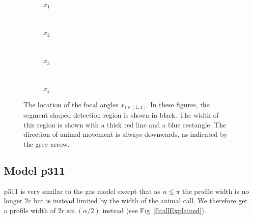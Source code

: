 \begin{figure}[t]
        \centering
        \begin{subfigure}[t]{0.34\textwidth}
                \centering
                \caption{$x_1$}
                \label{f:tikz1}
        \end{subfigure}
        ~ 
        \begin{subfigure}[t]{0.22\textwidth}
                \centering
                \caption{$x_2$}
                \label{f:x2}
        \end{subfigure}
        ~ 
	\begin{subfigure}[t]{0.22\textwidth}
                \centering
                \caption{$x_3$}
                \label{f:x3}
        \end{subfigure}%
	~
	\begin{subfigure}[t]{0.22\textwidth}
                \centering
                \caption{$x_4$}
                \label{f:x4}
        \end{subfigure}%
\caption{The location of the focal angles $x_{i\in[1,4]}$. In these figures, the segment shaped detection region is shown in black. The width of this region is shown with a thick red line and a blue rectangle. The direction of animal movement is always downwards, as indicated by the grey arrow.}
\label{f:xis}
\end{figure}



\subsection{Model p311} \label{p311}

p311 is very similar to the gas model except that as $\alpha \le \pi$ the profile width is no longer $2r$ but is instead limited by the width of the animal call. We therefore get a profile width of $2r\sin(\alpha/2)$ instead (see Fig~\ref{f:callExplained}).

